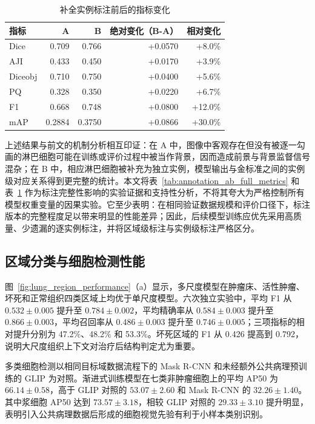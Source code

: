 \begin{table}[htbp]
  \centering
  \caption{补全实例标注前后的指标变化}
  \label{tab:annotation_ab_delta}
  \begin{tabular}{lrrrr}
    \toprule
    指标 & A & B & 绝对变化（B-A） & 相对变化 \\
    \midrule
    Dice & 0.709 & 0.766 & +0.0570 & +8.0\% \\

    AJI & 0.433 & 0.450 & +0.0170 & +3.9\% \\
    Diceobj & 0.710 & 0.750 & +0.0400 & +5.6\% \\
    PQ & 0.328 & 0.350 & +0.0220 & +6.7\% \\
    F1 & 0.668 & 0.748 & +0.0800 & +12.0\% \\
    mAP & 0.2884 & 0.3750 & +0.0866 & +30.0\% \\
    \bottomrule
  \end{tabular}
\end{table}

上述结果与前文的机制分析相互印证：在 A 中，图像中客观存在但没有被逐一勾画的淋巴细胞可能在训练或评价过程中被当作背景，因而造成前景与背景监督信号混杂；在 B 中，相应淋巴细胞被补充为独立实例，模型输出与金标准之间的实例级对应关系得到更完整的统计。本文将表~\ref{tab:annotation_ab_full_metrics} 和表~\ref{tab:annotation_ab_delta} 作为标注完整性影响的实验证据和支持性分析，不将其夸大为严格控制所有模型权重变量的因果实验。它至少表明：在相同验证数据规模和评价口径下，标注版本的完整程度足以带来明显的性能差异；因此，后续模型训练应优先采用高质量、少遗漏的逐实例标注，并将区域级标注与实例级标注严格区分。

\subsection{区域分类与细胞检测性能}
图~\ref{fig:lung_region_performance}（a）显示，多尺度模型在肿瘤床、活性肿瘤、坏死和正常组织四类区域上均优于单尺度模型。六次独立实验中，平均 F1 从 $0.532\pm0.005$ 提升至 $0.784\pm0.002$，平均精确率从 $0.584\pm0.003$ 提升至 $0.866\pm0.003$，平均召回率从 $0.486\pm0.003$ 提升至 $0.746\pm0.005$；三项指标的相对提升分别为 47.2\%、48.2\% 和 53.3\%。坏死区域的 F1 从 0.426 提高到 0.792，说明大尺度组织上下文对治疗后结构判定尤为重要。

多类细胞检测以相同目标域数据流程下的 Mask R-CNN 和未经额外公共病理预训练的 GLIP 为对照。渐进式训练模型在七类非肿瘤细胞上的平均 AP50 为 $66.14\pm0.58$，高于 GLIP 对照的 $53.07\pm2.60$ 和 Mask R-CNN 的 $32.26\pm1.40$。其中浆细胞 AP50 达到 $73.57\pm3.18$，相较 GLIP 对照的 $29.33\pm3.10$ 提升明显，表明引入公共病理数据后形成的细胞视觉先验有利于小样本类别识别。

